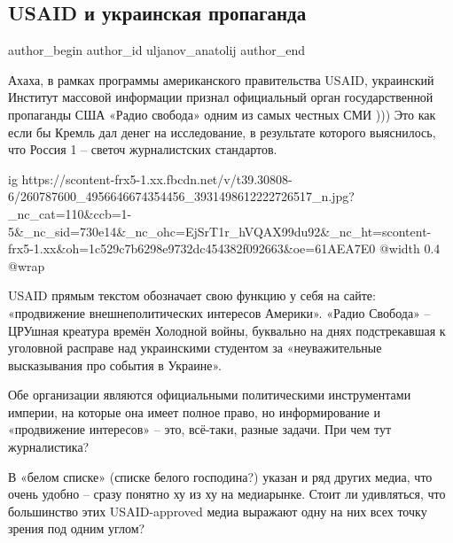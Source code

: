  
 
 
 
 
 
\subsection{USAID и украинская пропаганда}
\label{sec:25_11_2021.fb.uljanov_anatolij.1.usaid_ukr_propaganda}
 
\ifcmt
 author_begin
   author_id uljanov_anatolij
 author_end
\fi

Ахаха, в рамках программы американского правительства USAID, украинский
Институт массовой информации признал официальный орган государственной
пропаганды США «Радио свобода» одним из самых честных СМИ ))) Это как если бы
Кремль дал денег на исследование, в результате которого выяснилось, что Россия
1 – светоч журналистских стандартов.

\ifcmt
  ig https://scontent-frx5-1.xx.fbcdn.net/v/t39.30808-6/260787600_4956646674354456_3931498612222726517_n.jpg?_nc_cat=110&ccb=1-5&_nc_sid=730e14&_nc_ohc=EjSrT1r_hVQAX99du92&_nc_ht=scontent-frx5-1.xx&oh=1c529c7b6298e9732dc454382f092663&oe=61AEA7E0
  @width 0.4
  @wrap 
\fi

USAID прямым текстом обозначает свою функцию у себя на сайте: «продвижение
внешнеполитических интересов Америки». «Радио Свобода» – ЦРУшная креатура
времён Холодной войны, буквально на днях подстрекавшая к уголовной расправе над
украинскими студентом за «неуважительные высказывания про события в Украине». 

Обе организации являются официальными политическими инструментами империи, на
которые она имеет полное право, но информирование и «продвижение интересов» –
это, всё-таки, разные задачи. При чем тут журналистика?

В «белом списке» (списке белого господина?) указан и ряд других медиа, что
очень удобно – сразу понятно ху из ху на медиарынке. Стоит ли удивляться, что
большинство этих USAID-approved медиа выражают одну на них всех точку зрения
под одним углом?

